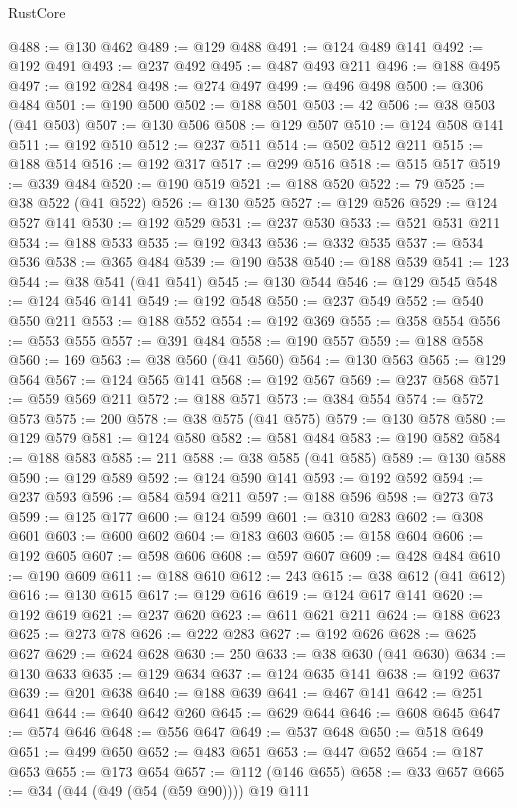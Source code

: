 \begin{lexlean}{RustCore}
\begin{coremodule}
@488 := @130 @462
@489 := @129 @488
@491 := @124 @489 @141
@492 := @192 @491
@493 := @237 @492
@495 := @487 @493 @211
@496 := @188 @495
@497 := @192 @284
@498 := @274 @497
@499 := @496 @498
@500 := @306 @484
@501 := @190 @500
@502 := @188 @501
@503 := 42
@506 := @38 @503 (@41 @503)
@507 := @130 @506
@508 := @129 @507
@510 := @124 @508 @141
@511 := @192 @510
@512 := @237 @511
@514 := @502 @512 @211
@515 := @188 @514
@516 := @192 @317
@517 := @299 @516
@518 := @515 @517
@519 := @339 @484
@520 := @190 @519
@521 := @188 @520
@522 := 79
@525 := @38 @522 (@41 @522)
@526 := @130 @525
@527 := @129 @526
@529 := @124 @527 @141
@530 := @192 @529
@531 := @237 @530
@533 := @521 @531 @211
@534 := @188 @533
@535 := @192 @343
@536 := @332 @535
@537 := @534 @536
@538 := @365 @484
@539 := @190 @538
@540 := @188 @539
@541 := 123
@544 := @38 @541 (@41 @541)
@545 := @130 @544
@546 := @129 @545
@548 := @124 @546 @141
@549 := @192 @548
@550 := @237 @549
@552 := @540 @550 @211
@553 := @188 @552
@554 := @192 @369
@555 := @358 @554
@556 := @553 @555
@557 := @391 @484
@558 := @190 @557
@559 := @188 @558
@560 := 169
@563 := @38 @560 (@41 @560)
@564 := @130 @563
@565 := @129 @564
@567 := @124 @565 @141
@568 := @192 @567
@569 := @237 @568
@571 := @559 @569 @211
@572 := @188 @571
@573 := @384 @554
@574 := @572 @573
@575 := 200
@578 := @38 @575 (@41 @575)
@579 := @130 @578
@580 := @129 @579
@581 := @124 @580
@582 := @581 @484
@583 := @190 @582
@584 := @188 @583
@585 := 211
@588 := @38 @585 (@41 @585)
@589 := @130 @588
@590 := @129 @589
@592 := @124 @590 @141
@593 := @192 @592
@594 := @237 @593
@596 := @584 @594 @211
@597 := @188 @596
@598 := @273 @73
@599 := @125 @177
@600 := @124 @599
@601 := @310 @283
@602 := @308 @601
@603 := @600 @602
@604 := @183 @603
@605 := @158 @604
@606 := @192 @605
@607 := @598 @606
@608 := @597 @607
@609 := @428 @484
@610 := @190 @609
@611 := @188 @610
@612 := 243
@615 := @38 @612 (@41 @612)
@616 := @130 @615
@617 := @129 @616
@619 := @124 @617 @141
@620 := @192 @619
@621 := @237 @620
@623 := @611 @621 @211
@624 := @188 @623
@625 := @273 @78
@626 := @222 @283
@627 := @192 @626
@628 := @625 @627
@629 := @624 @628
@630 := 250
@633 := @38 @630 (@41 @630)
@634 := @130 @633
@635 := @129 @634
@637 := @124 @635 @141
@638 := @192 @637
@639 := @201 @638
@640 := @188 @639
@641 := @467 @141
@642 := @251 @641
@644 := @640 @642 @260
@645 := @629 @644
@646 := @608 @645
@647 := @574 @646
@648 := @556 @647
@649 := @537 @648
@650 := @518 @649
@651 := @499 @650
@652 := @483 @651
@653 := @447 @652
@654 := @187 @653
@655 := @173 @654
@657 := @112 (@146 @655)
@658 := @33 @657
@665 := @34 (@44 (@49 (@54 (@59 @90)))) @19 @111

\end{coremodule}
\end{lexlean}
